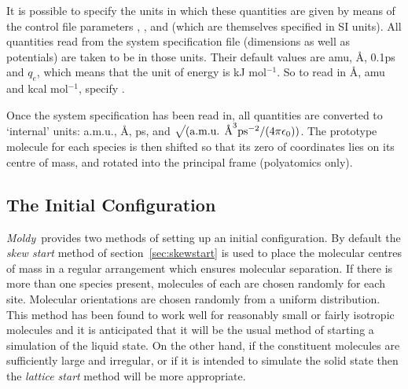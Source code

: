 \documentclass[a4paper,twoside]{report}
\newcommand{\moldy}{\emph{Moldy}}
\newcommand{\insqrt}{\sqrt{\mathstrut}}
\begin{document}
It is possible to specify the units in which these quantities are given
by means of the control file parameters ,
,  and  
(which are themselves specified in SI units). All quantities read from
the system specification file (dimensions as well as potentials) are
taken to be in those units. Their default values are amu, \AA, 0.1ps
and $q_{e}$, which means that the unit of energy is kJ mol$^{-1}$.  So
to read in \AA, amu and kcal mol$^{-1}$, specify
.

Once the system specification has been read in, all quantities are
converted to `internal' units: a.m.u., \AA, ps, and $\insqrt (
\textnormal{a.m.u. \AA}^{3} \textnormal{ps}^{-2}/(4 \pi \epsilon_{0}) )$.
The prototype molecule for each species is then shifted so that its
zero of coordinates lies on its centre of mass, and rotated into the
principal frame (polyatomics only).

\subsection{The Initial Configuration}

\moldy\  provides two methods of setting up an initial configuration.
By default the \emph{skew start} method of section~\ref{sec:skewstart}
is used to place the molecular centres of mass in a regular
arrangement which ensures molecular separation.  If there is more than
one species present, molecules of each are chosen randomly for each
site.  Molecular orientations are chosen randomly from a uniform
distribution.  This method has been found to work well for reasonably
small or fairly isotropic molecules and it is anticipated that it will
be the usual method of starting a simulation of the liquid state.   On
the other hand, if the constituent molecules are sufficiently large
and irregular, or if it is intended to simulate the solid state then
the \emph{lattice start} method will be more appropriate.
\end{document}
